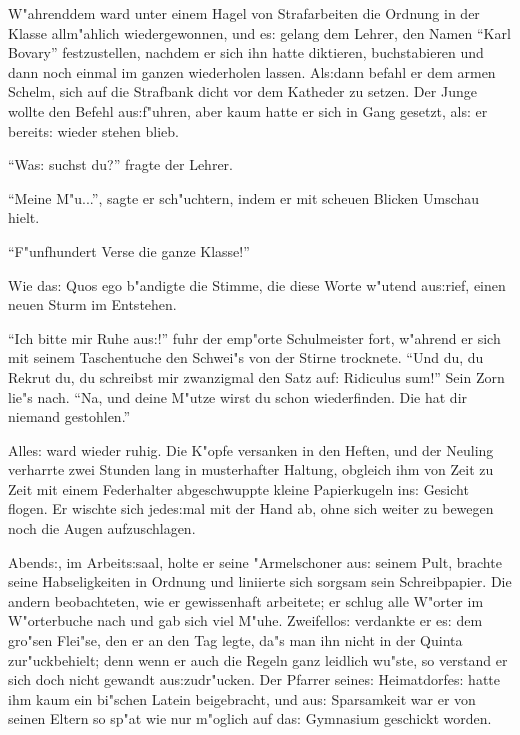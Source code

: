 \documentclass[oneside,12pt]{book}
\newenvironment{antiqua}{\normalfont}{}%
\newcommand{\s}{s:}%
\begin{document}
W"ahrenddem ward unter einem Hagel von Strafarbeiten die Ordnung
in der Klasse allm"ahlich wiedergewonnen, und e{\s} gelang dem
Lehrer, den Namen "`Karl Bovary"' fest\/zustellen, nachdem er sich
ihn hatte diktieren, buchstabieren und dann noch einmal im ganzen
wiederholen lassen. Al{\s}dann befahl er dem armen Schelm, sich
auf die Strafbank dicht vor dem Katheder zu setzen. Der Junge
wollte den Befehl au{\s}f"uhren, aber kaum hatte er sich in Gang
gesetzt, al{\s} er bereit{\s} wieder stehen blieb.

"`Wa{\s} suchst du?"' fragte der Lehrer.

"`Meine M"u..."', sagte er sch"uchtern, indem er mit scheuen
Blicken Umschau hielt.

"`F"unfhundert Verse die ganze Klasse!"'

Wie da{\s} \begin{antiqua}Quos ego\end{antiqua} b"andigte
die Stimme, die diese Worte w"utend au{\s}rief, einen neuen
Sturm im Entstehen.

"`Ich bitte mir Ruhe au{\s}!"' fuhr der emp"orte Schulmeister
fort, w"ahrend er sich mit seinem Taschentuche den Schwei"s von
der Stirne trocknete. "`Und du, du Rekrut du, du schreibst mir
zwanzigmal den Satz auf: \begin{antiqua}Ridiculus
sum\end{antiqua}!"' Sein Zorn lie"s nach. "`Na, und deine M"utze
wirst du schon wiederfinden. Die hat dir niemand gestohlen."'

Alle{\s} ward wieder ruhig. Die K"opfe versanken in den Heften,
und der Neuling verharrte zwei Stunden lang in musterhafter
Haltung, obgleich ihm von Zeit zu Zeit mit einem Federhalter
abgeschwuppte kleine Papierkugeln in{\s} Gesicht flogen. Er wischte
sich jede{\s}mal mit der Hand ab, ohne sich weiter zu bewegen noch
die Augen aufzuschlagen.

Abend{\s}, im Arbeit{\s}saal, holte er seine "Armelschoner au{\s}
seinem Pult, brachte seine Habseligkeiten in Ordnung und liniierte
sich sorgsam sein Schreibpapier. Die andern beobachteten, wie er
gewissenhaft arbeitete; er schlug alle W"orter im W"orterbuche
nach und gab sich viel M"uhe. Zweifello{\s} verdankte er e{\s} dem
gro"sen Flei"se, den er an den Tag legte, da"s man ihn nicht in
der Quinta zur"uckbehielt; denn wenn er auch die Regeln ganz
leidlich wu"ste, so verstand er sich doch nicht gewandt
au{\s}zudr"ucken. Der Pfarrer seine{\s} Heimatdorfe{\s} hatte ihm
kaum ein bi"schen Latein beigebracht, und au{\s} Sparsamkeit war
er von seinen Eltern so sp"at wie nur m"oglich auf da{\s}
Gymnasium geschickt worden.
\end{document}
